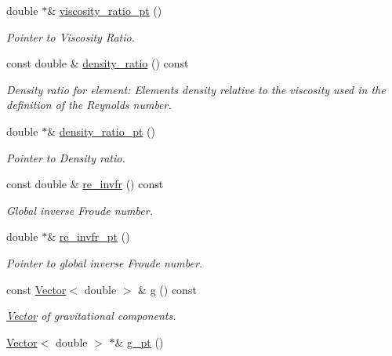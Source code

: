 \begin{DoxyCompactItemize}
double $\ast$\& \hyperlink{classoomph_1_1NavierStokesEquations_a99a9507dd255fca305ec65220bcf7e3c}{viscosity\+\_\+ratio\+\_\+pt} ()
\begin{DoxyCompactList}\small\item\em Pointer to Viscosity Ratio. \end{DoxyCompactList}\item 
const double \& \hyperlink{classoomph_1_1NavierStokesEquations_ae1fe9129b87052e804a3e204ed62a6c2}{density\+\_\+ratio} () const
\begin{DoxyCompactList}\small\item\em Density ratio for element\+: Element\textquotesingle{}s density relative to the viscosity used in the definition of the Reynolds number. \end{DoxyCompactList}\item 
double $\ast$\& \hyperlink{classoomph_1_1NavierStokesEquations_a74ed476b9cae298f55e56a2a6a970b02}{density\+\_\+ratio\+\_\+pt} ()
\begin{DoxyCompactList}\small\item\em Pointer to Density ratio. \end{DoxyCompactList}\item 
const double \& \hyperlink{classoomph_1_1NavierStokesEquations_a98252e40ee808732a128f9f9241e62d4}{re\+\_\+invfr} () const
\begin{DoxyCompactList}\small\item\em Global inverse Froude number. \end{DoxyCompactList}\item 
double $\ast$\& \hyperlink{classoomph_1_1NavierStokesEquations_a3be405ed2c9a6d798d6a0cae5ef6f2bb}{re\+\_\+invfr\+\_\+pt} ()
\begin{DoxyCompactList}\small\item\em Pointer to global inverse Froude number. \end{DoxyCompactList}\item 
const \hyperlink{classoomph_1_1Vector}{Vector}$<$ double $>$ \& \hyperlink{classoomph_1_1NavierStokesEquations_aefe9f833c45ff77f6e73b33cbb68b6ee}{g} () const
\begin{DoxyCompactList}\small\item\em \hyperlink{classoomph_1_1Vector}{Vector} of gravitational components. \end{DoxyCompactList}\item 
\hyperlink{classoomph_1_1Vector}{Vector}$<$ double $>$ $\ast$\& \hyperlink{classoomph_1_1NavierStokesEquations_aba22e0202e4252d8a2970e896aed0ef2}{g\+\_\+pt} ()

\end{DoxyCompactItemize}
